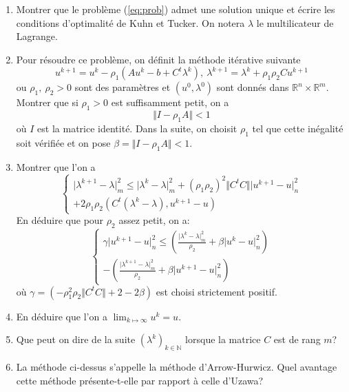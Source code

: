 \documentclass[11pt, a4paper]{article}
\begin{document}
\begin{enumerate}
\item Montrer que le problème (\ref{eq:prob}) admet une solution unique et écrire les conditions d'optimalité de Kuhn et Tucker. On notera $\lambda$ le multilicateur de Lagrange.
\item Pour résoudre ce problème, on définit la méthode itérative suivante
\begin{equation}
u^{k+1} = u^k - \rho_1 (A u^k - b +C^t \lambda^k), ~ \lambda^{k+1} = \lambda^k + \rho_1\rho_2 C u^{k+1}
\end{equation}
ou $\rho_1, ~ \rho_2 >0$ sont des paramètres et $(u^0,\lambda^0)$ sont donnés dans $\mathbb{R}^n \times \mathbb{R}^m$. Montrer que si $\rho_1 > 0$ est suffisamment petit, on a 
\begin{equation}
\Vert I - \rho_1 A \Vert < 1
\end{equation}
où $I$ est la matrice identité. Dans la suite, on choisit $\rho_1$ tel que cette inégalité soit vérifiée et on pose $\beta = \Vert I - \rho_1 A\Vert < 1$.
\item Montrer que l'on a 
\begin{equation}
\left\lbrace
\begin{array}{cc}
\displaystyle \vert \lambda^{k+1} - \lambda \vert^2_m \leq \vert \lambda^{k} - \lambda \vert^2_m  + (\rho_1 \rho_2)^2 \Vert C^t C \Vert \vert u^{k+1} - u\vert^2_n \\
+ 2\rho_1\rho_2(C^t(\lambda^k - \lambda),u^{k+1}-u)
\end{array}
\right.
\end{equation}
En déduire que pour $\rho_2$ assez petit, on a:
\begin{equation}
\left\lbrace
\begin{array}{cc}
\displaystyle \gamma \vert u^{k+1} - u \vert^2_n \leq (\frac{\vert \lambda^k-\lambda\vert^2_m}{\rho_2} + \beta \vert u^k - u\vert^2_n)\\
-(\frac{\vert \lambda^{k+1} - \lambda \vert^2_m}{\rho_2} + \beta \vert u^{k+1} - u\vert^2_n)
\end{array}
\right.
\end{equation}
où $\gamma = (-\rho_1^2 \rho_2 \Vert C^t C\Vert + 2 - 2\beta )$ est choisi strictement positif.
\item En déduire que l'on a $\lim_{k\mapsto \infty} u^k = u$.
\item Que peut on dire de la suite $(\lambda^k)_{k \in \mathbb{N}}$ lorsque la matrice $C$ est de rang $m$?
\item La méthode ci-dessus s'appelle la méthode d'Arrow-Hurwicz. Quel avantage cette méthode présente-t-elle par rapport à celle d'Uzawa?
\end{enumerate}

%
\end{document}
